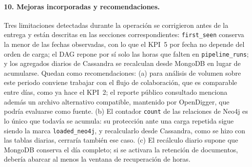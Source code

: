\paragraph{10. Mejoras incorporadas y recomendaciones.} Tres limitaciones detectadas durante la operación se corrigieron antes de la entrega y están descritas en las secciones correspondientes: \texttt{first\_seen} conserva la menor de las fechas observadas, con lo que el KPI~5 por fecha no depende del orden de carga; el DAG repone por sí solo las horas que falten en \texttt{pipeline\_runs}; y los agregados diarios de Cassandra se recalculan desde MongoDB en lugar de acumularse. Quedan como recomendaciones: (a) para análisis de volumen sobre este periodo conviene trabajar con el flujo de colaboración, que es comparable entre días, como ya hace el KPI~2; el reporte público consultado menciona además un archivo alternativo compatible, mantenido por OpenDigger, que podría evaluarse como fuente. (b) El contador \texttt{count} de las relaciones de Neo4j es lo único que todavía se acumula: su protección ante una carga repetida sigue siendo la marca \texttt{loaded\_neo4j}, y recalcularlo desde Cassandra, como se hizo con las tablas diarias, cerraría también ese caso. (c) El recálculo diario supone que MongoDB conserva el día completo; si se activara la retención de documentos, debería abarcar al menos la ventana de recuperación de horas.
